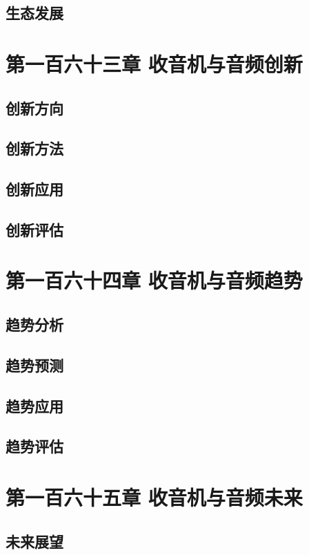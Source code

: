 \documentclass[12pt,UTF8]{ctexbook}
\begin{document}
\section{生态发展}

\chapter{第一百六十三章 收音机与音频创新}

\section{创新方向}
\section{创新方法}
\section{创新应用}
\section{创新评估}

\chapter{第一百六十四章 收音机与音频趋势}

\section{趋势分析}
\section{趋势预测}
\section{趋势应用}
\section{趋势评估}

\chapter{第一百六十五章 收音机与音频未来}

\section{未来展望}
\end{document}
